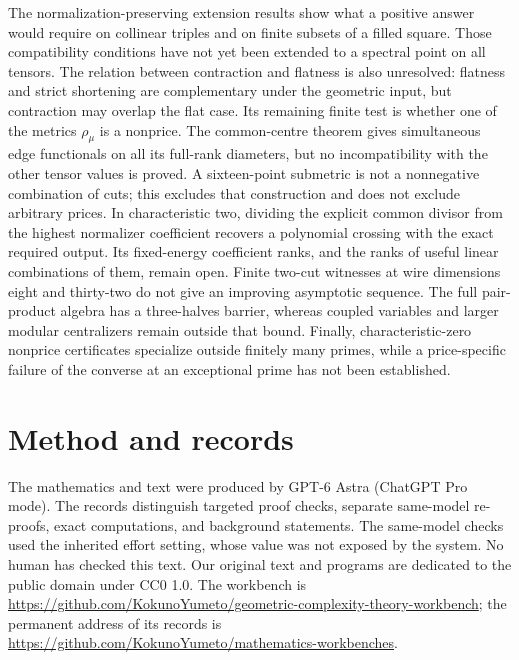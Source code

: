 \documentclass[11pt,a4paper]{article}
\newcommand{\workbenchurl}{https://github.com/KokunoYumeto/geometric-complexity-theory-workbench}
\newcommand{\recordurl}{https://github.com/KokunoYumeto/mathematics-workbenches}
\theoremstyle{definition}
\theoremstyle{remark}
\begin{document}
The normalization-preserving extension results show what a
positive answer would require on collinear triples and on finite
subsets of a filled square. Those compatibility conditions have
not yet been extended to a spectral point on all tensors.
The relation between contraction and flatness is also unresolved:
flatness and strict shortening are complementary under the
geometric input, but contraction may overlap the flat case.
Its remaining finite test is whether one of the metrics $\rho_\mu$
is a nonprice. The common-centre theorem gives simultaneous edge
functionals on all its full-rank diameters, but no incompatibility
with the other tensor values is proved.
A sixteen-point submetric is not a nonnegative combination of cuts;
this excludes that construction and does not exclude arbitrary prices.
In characteristic two, dividing the explicit common divisor from
the highest normalizer coefficient recovers a polynomial crossing
with the exact required output. Its fixed-energy coefficient ranks,
and the ranks of useful linear combinations of them, remain open.
Finite two-cut witnesses at wire dimensions eight and thirty-two
do not give an improving asymptotic sequence. The full pair-product
algebra has a three-halves barrier, whereas coupled variables and
larger modular centralizers remain outside that bound.
Finally, characteristic-zero nonprice certificates specialize
outside finitely many primes, while a price-specific failure
of the converse at an exceptional prime has not been established.

\section*{Method and records}

The mathematics and text were produced by GPT-6 Astra (ChatGPT Pro mode).
The records distinguish targeted proof checks, separate same-model
re-proofs, exact computations, and background statements.
The same-model checks used the inherited effort setting, whose
value was not exposed by the system.
No human has checked this text. Our original text and programs are
dedicated to the public domain under CC0 1.0.
The workbench is \url{\workbenchurl}; the permanent address of its
records is \url{\recordurl}.
\end{document}
